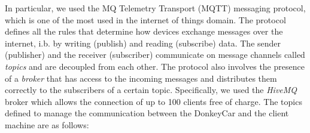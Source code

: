 In particular, we used the MQ Telemetry Transport (MQTT) messaging protocol, which is one of the most used in the internet of things domain. The protocol defines all the rules that determine how devices exchange messages over the internet, i.b. by writing (publish) and reading (subscribe) data. The sender (publisher) and the receiver (subscriber) communicate on message channels called \textit{topics} and are decoupled from each other. The protocol also involves the presence of a \textit{broker} that has access to the incoming messages and distributes them correctly to the subscribers of a certain topic. Specifically, we used the \textit{HiveMQ} broker which allows the connection of up to 100 clients free of charge. The topics defined to manage the communication between the DonkeyCar and the client machine are as follows:

